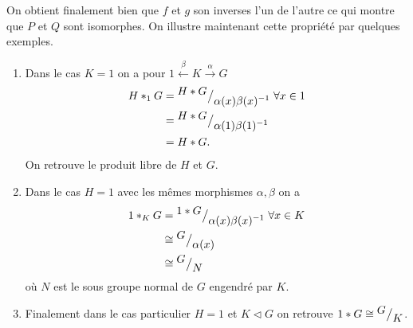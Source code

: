 \documentclass[main.tex]{subfiles}
\begin{document}
	On obtient finalement bien que $f$ et $g$ son inverses l'un de l'autre ce qui montre que $P$ et $Q$ sont isomorphes. On illustre maintenant cette propriété par quelques exemples.		

	\begin{example}
		\begin{enumerate}
			\item Dans le cas $K = 1$ on a pour $1 \overset{\beta}{\longleftarrow} K \overset{\alpha}{\longrightarrow} G$ 
				 \begin{align*}
					 H*_{1}G &= {^{\textstyle H*G}\big/_{\textstyle \alpha(x)\beta(x)^{-1}}} \; \forall x \in 1 \\
						 &= {^{\textstyle H*G}\big/_{\textstyle \alpha(1)\beta(1)^{-1}}} \\
						 &= H*G
				.\end{align*}
				On retrouve le produit libre de $H$ et $G$.
			\item Dans le cas $H = 1$ avec les mêmes morphismes  $\alpha, \beta$ on a 
				\begin{align*}
					1*_K G &= {^{\textstyle 1*G}\big/_{\textstyle \alpha(x)\beta(x)^{-1}}} \; \forall x \in K \\
					       &\cong {^{\textstyle G}\big/_{\textstyle \alpha(x)}} \\
					       &\cong {^{\textstyle G}\big/_{\textstyle N}}
				\end{align*}
				où $N$ est le sous groupe normal de $G$ engendré par $K$.
			\item Finalement dans le cas particulier $H=1$ et $K \triangleleft G$ on retrouve $1*G \cong {^{\textstyle G}\big/_{\textstyle K}}$.
		\end{enumerate}
	\end{example}
\end{document}
